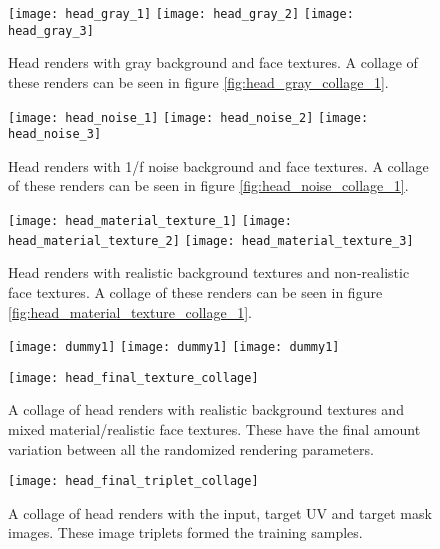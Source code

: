 \begin{figure}[p]
    \texttt{[image: head\_gray\_1]}\hfill
    \texttt{[image: head\_gray\_2]}\hfill
    \texttt{[image: head\_gray\_3]}
    \caption[Gray head renders]{Head renders with gray background and face textures. A collage of these renders can be seen in figure \ref{fig:head_gray_collage_1}.}
    \label{fig:head_gray_1}
\end{figure}

\begin{figure}[p]
    \texttt{[image: head\_noise\_1]}\hfill
    \texttt{[image: head\_noise\_2]}\hfill
    \texttt{[image: head\_noise\_3]}
    \caption[Noise head renders]{Head renders with 1/f noise background and face textures. A collage of these renders can be seen in figure \ref{fig:head_noise_collage_1}.}
    \label{fig:head_noise_1}
\end{figure}

\begin{figure}[p]
    \texttt{[image: head\_material\_texture\_1]}\hfill
    \texttt{[image: head\_material\_texture\_2]}\hfill
    \texttt{[image: head\_material\_texture\_3]}
    \caption[Non-realistic head renders]{Head renders with realistic background textures and non-realistic face textures. A collage of these renders can be seen in figure \ref{fig:head_material_texture_collage_1}.}
    \label{fig:head_material_texture_1}
\end{figure}

\begin{figure}[p]
    \texttt{[image: dummy1]}\hfill
    \texttt{[image: dummy1]}\hfill
    \texttt{[image: dummy1]}
    \caption*{}
\end{figure}

\begin{figure}
    \texttt{[image: head\_final\_texture\_collage]}
    \caption[Mixed head render collage]{A collage of head renders with realistic background textures and mixed material/realistic face textures. These have the final amount variation between all the randomized rendering parameters.}
    \label{fig:head_final_texture_collage_1}
\end{figure}

\begin{figure}
    \texttt{[image: head\_final\_triplet\_collage]}
    \caption[Head triplet render collage]{A collage of head renders with the input, target UV and target mask images. These image triplets formed the training samples.}
    \label{fig:head_final_triplet_collage_1}
\end{figure}

